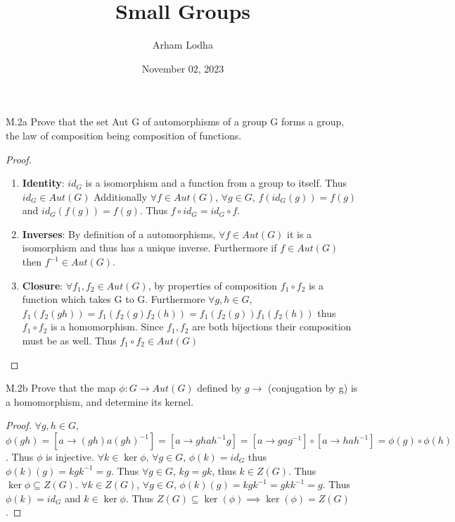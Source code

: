\documentclass{article}
\begin{document}
\title{Small Groups}
\author{Arham Lodha}%
\date{November 02, 2023}%
\maketitle

\begin{PROB}{M.2a}\label{Problem M.2a.}
    Prove that the set Aut G of automorphisms of a group G forms a group, the law of composition being composition of functions.
\end{PROB}
\begin{proof}
    \begin{enumerate}{}
        \item \textbf{Identity}: $id_G$ is a isomorphism and a function from a group to itself. Thus $id_G \in Aut(G)$ Additionally $\forall f \in Aut(G)$, $\forall g \in G$, $f(id_G(g)) = f(g)$ and $id_G(f(g)) = f(g)$. Thus $f \circ id_G = id_G \circ f$. 
        \item \textbf{Inverses}: By definition of a automorphisms, $\forall f \in Aut(G)$ it is a isomorphism and thus has a unique inverse. Furthermore if $f \in Aut(G)$ then $f^{-1} \in Aut(G)$.
        \item \textbf{Closure}: $\forall f_1, f_2 \in Aut(G)$, by properties of composition $f_1 \circ f_2$ is a function which takes G to G. Furthermore $\forall g, h \in G$, $f_1(f_2(gh)) = f_1(f_2(g)f_2(h)) = f_1(f_2(g))f_1(f_2(h))$ thus $f_1 \circ f_2$ is a homomorphism. Since $f_1, f_2$ are both bijections their composition must be as well. Thus $f_1 \circ f_2 \in Aut(G)$
    \end{enumerate}
\end{proof}

\begin{PROB}{M.2b}\label{Problem M.2b.}
    Prove that the map $\phi: G \to Aut(G)$ defined by $g \to $ (conjugation by g) is a homomorphism, and determine its kernel.
\end{PROB}
\begin{proof}
    $\forall g, h \in G$, $\phi(gh) = [a \to (gh)a(gh)^{-1}] = [a \to ghah^{-1}g] = [a \to gag^{-1}] \circ [a \to hah^{-1}] = \phi(g) \circ \phi(h)$. Thus $\phi$ is injective. $\forall k \in \ker \phi$, $\forall g \in G$, $\phi(k) = id_G$ thus $\phi(k)(g) = kgk^{-1} = g$. Thus $\forall g \in G$, $kg = gk$, thus $k \in Z(G)$. Thus $\ker \phi \subseteq Z(G)$. $\forall k \in Z(G)$, $\forall g \in G$, $\phi(k)(g) = kgk^{-1} = gkk^{-1} = g$. Thus $\phi(k) = id_G$ and $k \in \ker \phi$. Thus $Z(G) \subseteq \ker(\phi) \implies \ker(\phi) = Z(G)$.
\end{proof}
\end{document}

